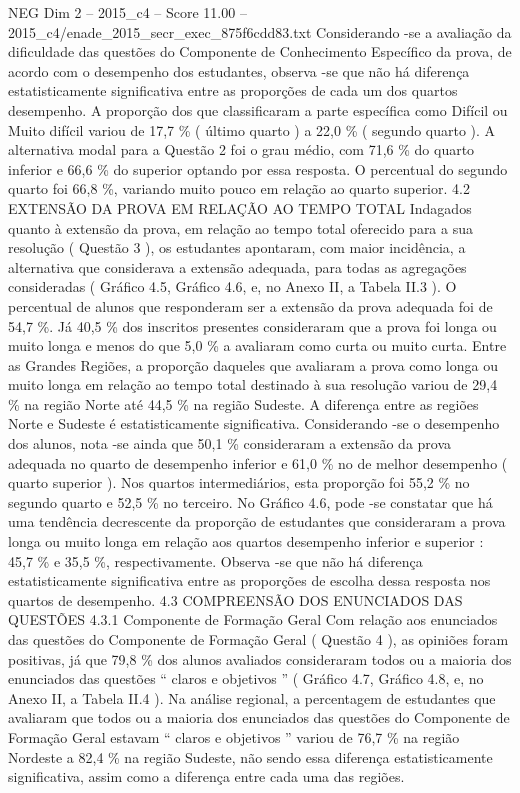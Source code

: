 \begin{textsample}{NEG Dim 2 – 2015\_c4 – Score 11.00 – 2015\_c4/enade\_2015\_secr\_exec\_875f6cdd83.txt}
Considerando -se a avaliação da dificuldade das questões do Componente de Conhecimento Específico da prova, de acordo com o desempenho dos estudantes, observa -se que não há diferença estatisticamente significativa entre as proporções de cada um dos quartos desempenho.
A proporção dos que classificaram a parte específica como Difícil ou Muito difícil variou de 17,7 \% ( último quarto ) a 22,0 \% ( segundo quarto ).
A alternativa modal para a Questão 2 foi o grau médio, com 71,6 \% do quarto inferior e 66,6 \% do superior optando por essa resposta.
O percentual do segundo quarto foi 66,8 \%, variando muito pouco em relação ao quarto superior. 4.2 EXTENSÃO DA PROVA EM RELAÇÃO AO TEMPO TOTAL Indagados quanto à extensão da prova, em relação ao tempo total oferecido para a sua resolução ( Questão 3 ), os estudantes apontaram, com maior incidência, a alternativa que considerava a extensão adequada, para todas as agregações consideradas ( Gráfico 4.5, Gráfico 4.6, e, no Anexo II, a Tabela II.3 ).
O percentual de alunos que responderam ser a extensão da prova adequada foi de 54,7 \%.
Já 40,5 \% dos inscritos presentes consideraram que a prova foi longa ou muito longa e menos do que 5,0 \% a avaliaram como curta ou muito curta.
Entre as Grandes Regiões, a proporção daqueles que avaliaram a prova como longa ou muito longa em relação ao tempo total destinado à sua resolução variou de 29,4 \% na região Norte até 44,5 \% na região Sudeste.
A diferença entre as regiões Norte e Sudeste é estatisticamente significativa.
Considerando -se o desempenho dos alunos, nota -se ainda que 50,1 \% consideraram a extensão da prova adequada no quarto de desempenho inferior e 61,0 \% no de melhor desempenho ( quarto superior ).
Nos quartos intermediários, esta proporção foi 55,2 \% no segundo quarto e 52,5 \% no terceiro.
No Gráfico 4.6, pode -se constatar que há uma tendência decrescente da proporção de estudantes que consideraram a prova longa ou muito longa em relação aos quartos desempenho inferior e superior : 45,7 \% e 35,5 \%, respectivamente.
Observa -se que não há diferença estatisticamente significativa entre as proporções de escolha dessa resposta nos quartos de desempenho. 4.3 COMPREENSÃO DOS ENUNCIADOS DAS QUESTÕES 4.3.1 Componente de Formação Geral Com relação aos enunciados das questões do Componente de Formação Geral ( Questão 4 ), as opiniões foram positivas, já que 79,8 \% dos alunos avaliados consideraram todos ou a maioria dos enunciados das questões “ claros e objetivos ” ( Gráfico 4.7, Gráfico 4.8, e, no Anexo II, a Tabela II.4 ).
Na análise regional, a percentagem de estudantes que avaliaram que todos ou a maioria dos enunciados das questões do Componente de Formação Geral estavam “ claros e objetivos ” variou de 76,7 \% na região Nordeste a 82,4 \% na região Sudeste, não sendo essa diferença estatisticamente significativa, assim como a diferença entre cada uma das regiões.

\end{textsample}
